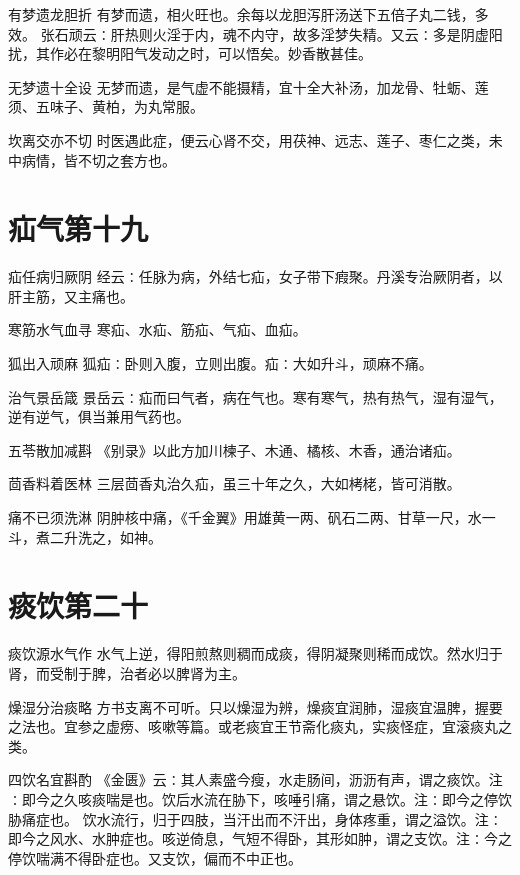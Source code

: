 \documentclass[a4paper,12pt,UTF8,twoside]{ctexbook}
\begin{document}
    有梦遗龙胆折
    有梦而遗，相火旺也。余每以龙胆泻肝汤送下五倍子丸二钱，多效。
    张石顽云∶肝热则火淫于内，魂不内守，故多淫梦失精。又云∶多是阴虚阳扰，其作必在黎明阳气发动之时，可以悟矣。妙香散甚佳。
    
    无梦遗十全设
    无梦而遗，是气虚不能摄精，宜十全大补汤，加龙骨、牡蛎、莲须、五味子、黄柏，为丸常服。
    
    坎离交亦不切
    时医遇此症，便云心肾不交，用茯神、远志、莲子、枣仁之类，未中病情，皆不切之套方也。
    
    \section{疝气第十九}
      疝任病归厥阴
    经云∶任脉为病，外结七疝，女子带下瘕聚。丹溪专治厥阴者，以肝主筋，又主痛也。
    
    寒筋水气血寻
    寒疝、水疝、筋疝、气疝、血疝。
    
    狐出入顽麻
    狐疝∶卧则入腹，立则出腹。疝∶大如升斗，顽麻不痛。
    
    治气景岳箴
    景岳云∶疝而曰气者，病在气也。寒有寒气，热有热气，湿有湿气，逆有逆气，俱当兼用气药也。
    
    五苓散加减斟
    《别录》以此方加川楝子、木通、橘核、木香，通治诸疝。
    
    茴香料着医林
    三层茴香丸治久疝，虽三十年之久，大如栲栳，皆可消散。
    
    痛不已须洗淋
    阴肿核中痛，《千金翼》用雄黄一两、矾石二两、甘草一尺，水一斗，煮二升洗之，如神。
    
    
    
    \section{痰饮第二十}
        
    痰饮源水气作
    水气上逆，得阳煎熬则稠而成痰，得阴凝聚则稀而成饮。然水归于肾，而受制于脾，治者必以脾肾为主。
    
    燥湿分治痰略
    方书支离不可听。只以燥湿为辨，燥痰宜润肺，湿痰宜温脾，握要之法也。宜参之虚痨、咳嗽等篇。或老痰宜王节斋化痰丸，实痰怪症，宜滚痰丸之类。
    
    四饮名宜斟酌
    《金匮》云∶其人素盛今瘦，水走肠间，沥沥有声，谓之痰饮。注∶即今之久咳痰喘是也。饮后水流在胁下，咳唾引痛，谓之悬饮。注∶即今之停饮胁痛症也。
    饮水流行，归于四肢，当汗出而不汗出，身体疼重，谓之溢饮。注∶即今之风水、水肿症也。咳逆倚息，气短不得卧，其形如肿，谓之支饮。注∶今之停饮喘满不得卧症也。又支饮，偏而不中正也。
    
\end{document}
